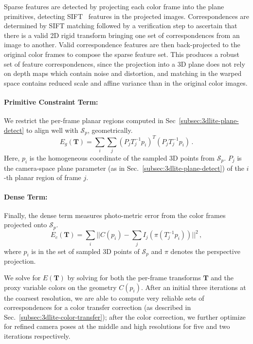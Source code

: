 Sparse features are detected by projecting each color frame into the plane primitives, detecting SIFT~\cite{lowe2004distinctive} features in the projected images.
Correspondences are determined by SIFT matching followed by a verification step to ascertain that there is a valid 2D rigid transform bringing one set of correspondences from an image to another.
Valid correspondence features are then back-projected to the original color frames to compose the sparse feature set. 
This produces a robust set of feature correspondences, since the projection into a 3D plane does not rely on depth maps which contain noise and distortion, and matching in the warped space contains reduced scale and affine variance than in the original color images.

\paragraph*{Primitive Constraint Term:}
We restrict the per-frame planar regions computed in Sec~\ref{subsec:3dlite-plane-detect} to align well with $\mathcal{S}_p$, geometrically.
\begin{equation}
E_g(\mathbf{T}) = \sum_{i} \sum_{j} (P_j T_j^{-1} p_i)^T (P_j T_j^{-1} p_i)\,.
\label{eq:pose-optim-geo}
\end{equation}
Here, $p_i$ is the homogeneous coordinate of the sampled 3D points from $\mathcal{S}_p$. $P_j$ is the camera-space plane parameter (as in Sec.~\ref{subsec:3dlite-plane-detect}) of the $i$-th planar region of frame $j$.

\paragraph*{Dense Term:} 
Finally, the dense term measures photo-metric error from the color frames projected onto $\mathcal{S}_p$.
\begin{equation}
E_c(\mathbf{T}) = \sum_{i} ||C(p_i) - \sum_j I_j(\pi(T_j^{-1}p_i))||^2\,,
\label{eq:pose-optim-color}
\end{equation} 
where $p_i$ is in the set of sampled 3D points of $\mathcal{S}_p$ and $\pi$ denotes the perspective projection.

We solve for $E(\mathbf{T})$ by solving for both the per-frame transforms $\mathbf{T}$ and the proxy variable colors on the geometry $C(p_i)$.
After an initial three iterations at the coarsest resolution, we are able to compute very reliable sets of correspondences for a color transfer correction (as described in Sec.~\ref{subsec:3dlite-color-transfer}); after the color correction, we further optimize for refined camera poses at the middle and high resolutions for five and two iterations respectively.

